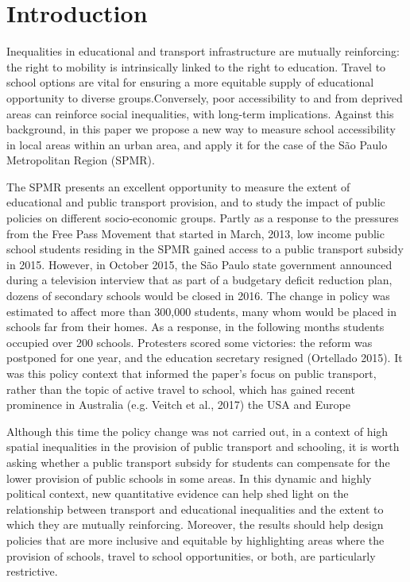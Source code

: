 \documentclass[3p,authoryear,preprint,review,12pt]{elsarticle}
\begin{document}
\newpage
\section{Introduction}\label{introduction}

Inequalities in educational and transport infrastructure are mutually reinforcing: the right to mobility is intrinsically linked to the right to education. Travel to school options are vital for ensuring a more equitable supply of educational opportunity to diverse groups.Conversely, poor accessibility to and from deprived areas can reinforce social inequalities, with long-term implications. Against this background, in this paper we propose a new way to measure school accessibility in local areas within an urban area, and apply it for the case of the São Paulo Metropolitan Region (SPMR).

The SPMR presents an excellent opportunity to measure the extent of
educational and public transport provision, and to study the impact of
public policies on different socio-economic groups. Partly as a response to the pressures from the Free Pass Movement that started in March, 2013, low income public school students residing in the SPMR gained access to a public transport subsidy in 2015. However, in October 2015, the São Paulo state government announced during a television interview that as part of a budgetary deficit reduction plan, dozens of secondary schools would be closed in 2016. The change in policy was estimated to affect more than 300,000 students, many whom would be placed in schools far from their homes. As a response, in the following months students occupied over 200 schools. Protesters scored some victories: the reform was postponed for one year, and the education secretary resigned (Ortellado 2015).
It was this policy context that informed the paper's focus on public transport, rather than the topic of active travel to school, which has gained recent prominence in Australia (e.g. Veitch et al., 2017) the USA and Europe 

Although this time the policy change was not carried out, in a context of high spatial inequalities in the provision of public transport and schooling, it is worth asking whether a public transport subsidy for students can compensate for the lower provision of public schools in some areas. In this dynamic and highly political context, new quantitative evidence can help shed light on the relationship between transport and educational inequalities and the extent to which they are mutually reinforcing. Moreover, the results should help design policies that are more inclusive and equitable by highlighting areas where the
provision of schools, travel to school opportunities, or both, are
particularly restrictive.
\end{document}
